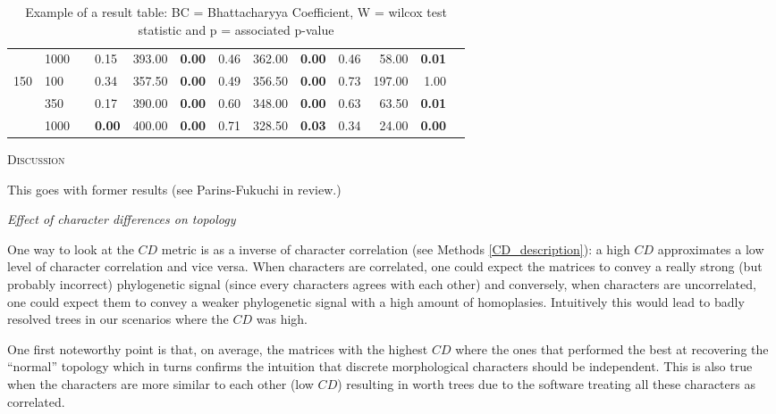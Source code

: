 \documentclass[12pt,letterpaper]{article}
\renewcommand{\section}[1]{%
\bigskip
\begin{center}
\begin{Large}
\normalfont\scshape #1
\medskip
\end{Large}
\end{center}}
\renewcommand{\subsection}[1]{%
\bigskip
\begin{center}
\begin{large}
\normalfont\itshape #1
\end{large}
\end{center}}
\begin{document}
\begin{table}[ht]
\begin{tabular}{rlllrrrrrrrrr}
   & 1000 &   & 0.15 & 393.00 & \textbf{0.00} & 0.46 & 362.00 & \textbf{0.00} & 0.46 & 58.00 & \textbf{0.01} \\ 
150 & 100 &   & 0.34 & 357.50 & \textbf{0.00} & 0.49 & 356.50 & \textbf{0.00} & 0.73 & 197.00 & 1.00 \\ 
    & 350 &   & 0.17 & 390.00 & \textbf{0.00} & 0.60 & 348.00 & \textbf{0.00} & 0.63 & 63.50 & \textbf{0.01} \\ 
    & 1000 &   & \textbf{0.00} & 400.00 & \textbf{0.00} & 0.71 & 328.50 &\textbf{0.03} & 0.34 & 24.00 & \textbf{0.00} \\ 
   \hline
\end{tabular}
\caption{Example of a result table: BC = Bhattacharyya Coefficient, W = wilcox test statistic and p = associated p-value} 
\label{LABEL}
\end{table}




\section{Discussion}

This goes with former results (see Parins-Fukuchi in review.)

\subsection{Effect of character differences on topology}
One way to look at the $CD$ metric is as a inverse of character correlation (see Methods \ref{CD_description}): a high $CD$ approximates a low level of character correlation and vice versa.
When characters are correlated, one could expect the matrices to convey a really strong (but probably incorrect) phylogenetic signal (since every characters agrees with each other) and conversely, when characters are uncorrelated, one could expect them to convey a weaker phylogenetic signal with a high amount of homoplasies.
Intuitively this would lead to badly resolved trees in our scenarios where the $CD$ was high.

One first noteworthy point is that, on average, the matrices with the highest $CD$ where the ones that performed the best at recovering the ``normal'' topology which in turns confirms the intuition that discrete morphological characters should be independent.
This is also true when the characters are more similar to each other (low $CD$) resulting in worth trees due to the software treating all these characters as correlated.
\end{document}
